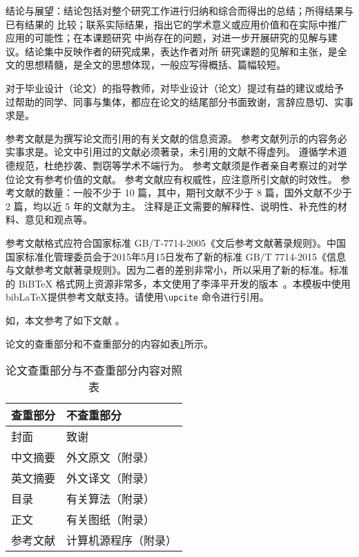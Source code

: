 结论与展望：结论包括对整个研究工作进行归纳和综合而得出的总结；所得结果与已有结果的
比较；联系实际结果，指出它的学术意义或应用价值和在实际中推广应用的可能性；在本课题研究 中尚存在的问题，对进一步开展研究的见解与建议。结论集中反映作者的研究成果，表达作者对所 研究课题的见解和主张，是全文的思想精髓，是全文的思想体现，一般应写得概括、篇幅较短。


对于毕业设计（论文）的指导教师，对毕业设计（论文）提过有益的建议或给予 过帮助的同学、同事与集体，都应在论文的结尾部分书面致谢，言辞应恳切、实事求是。



参考文献是为撰写论文而引用的有关文献的信息资源。
参考文献列示的内容务必实事求是。论文中引用过的文献必须著录，未引用的文献不得虚列。
遵循学术道德规范，杜绝抄袭、剽窃等学术不端行为。
参考文献须是作者亲自考察过的对学位论文有参考价值的文献。
参考文献应有权威性，应注意所引文献的时效性。 参考文献的数量：一般不少于 10 篇，其中，期刊文献不少于 8 篇，国外文献不少于 2 篇，均以近 5 年的文献为主。 注释是正文需要的解释性、说明性、补充性的材料、意见和观点等。


参考文献格式应符合国家标准 GB/T-7714-2005《文后参考文献著录规则》。中国国家标准化管理委员会于2015年5月15日发布了新的标准 GB/T 7714-2015《信息与文献参考文献著录规则》。因为二者的差别非常小，所以采用了新的标准。标准的 BiBTeX 格式网上资源非常多，本文使用了李泽平开发的版本~。本模板中使用 bib\LaTeX  提供参考文献支持。请使用\texttt{\textbackslash upcite} 命令进行引用。

如，本文参考了如下文献 。




论文的查重部分和不查重部分的内容如表\ref{tab_check}所示。

\begin{table}[!h]
	\renewcommand{\arraystretch}{1.2}
	\centering\wuhao
	\caption{论文查重部分与不查重部分内容对照表} \label{tab_check} \vspace{2mm}
	\begin{tabularx}{\textwidth} { >{\centering\arraybackslash}X >{\centering\arraybackslash}X }
	\toprule[1.5pt]
		查重部分 & 不查重部分 \\
	\midrule[1pt]
		封面        &   致谢                \\
		中文摘要    &   外文原文（附录）    \\
		英文摘要    &   外文译文（附录）    \\
		目录        &   有关算法（附录）    \\
		正文        &   有关图纸（附录）    \\
		参考文献    &   计算机源程序（附录）\\    
	\bottomrule[1.5pt]
	\end{tabularx}
\end{table}

